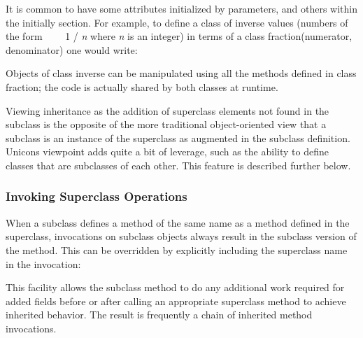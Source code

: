 
It is common to have some attributes initialized by parameters, and
others within the initially section. For example, to define a class of
inverse values (numbers of the form \ \ \ \ 1 / \textit{n} where
\textit{n} is an integer) in terms of a class fraction(numerator,
denominator) one would write: 


Objects of class inverse can be manipulated using all the methods
defined in class fraction; the code is actually shared by both classes
at runtime. 

Viewing inheritance as the addition of superclass elements not found in
the subclass is the opposite of the more traditional object-oriented
view that a subclass is an instance of the
superclass as augmented in the subclass definition.
Unicon{\textquotesingle}s viewpoint adds quite a bit of leverage, such
as the ability to define classes that are subclasses of each other.
This feature is described further below. 

\subsubsection[Invoking Superclass Operations]{Invoking Superclass
Operations}

When a subclass defines a
method of the same name as a method defined in the superclass,
invocations on subclass objects always result in the
subclass{\textquotesingle} version of the
method. This can be overridden by explicitly
including the superclass name in the invocation: 


This facility allows the subclass method to do any additional work
required for added fields before or after calling an appropriate
superclass method to achieve inherited behavior. The result is
frequently a chain of inherited method invocations. 


